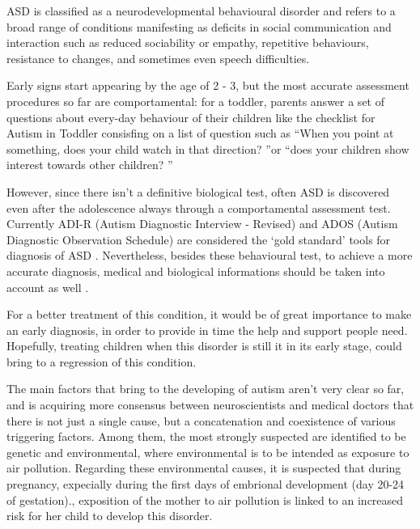 \documentclass[10pt]{report}
\begin{document}
ASD is classified as a neurodevelopmental behavioural disorder \cite{guze-1995} \cite{who-1993} and refers to a broad range of conditions manifesting as deficits in social communication and interaction such as reduced sociability or empathy, repetitive behaviours, resistance to changes, and sometimes even speech difficulties.\cite{rapin-2008}


Early signs start appearing by the age of 2 - 3, but the most accurate assessment procedures so far are comportamental: for a toddler, parents answer a set of questions about every-day behaviour of their children like the checklist for Autism in Toddler \cite{robins-2009} consisfing on a list of question such as \textquotedblleft When you point at something, does your child watch in that direction? \textquotedblright or \textquotedblleft does your children show interest towards other children? \textquotedblright

However, since there isn't a definitive biological test, often ASD is discovered even after the adolescence always through a comportamental assessment test.
Currently ADI-R (Autism Diagnostic Interview - Revised) and ADOS (Autism Diagnostic Observation Schedule) are considered the ‘gold standard’ tools for diagnosis of ASD \cite{ozonoff-2015} \cite{lecouteur-2008}.
Nevertheless, besides these behavioural test, to achieve a more accurate diagnosis, medical and biological informations should be taken into account as well .

For a better treatment of this condition, it would be of great importance to make an early diagnosis, in order to provide in time the help and support people need.
Hopefully, treating children when this disorder is still it in its early stage, could bring to a regression of this condition.

The main factors that bring to the developing of autism aren't very clear so far, and is acquiring more consensus between neuroscientists and medical doctors that there is not just a single cause, but a concatenation and coexistence of various triggering factors.
Among them, the most strongly suspected are identified to be genetic and environmental, where environmental is to be intended as exposure to air pollution.
Regarding these environmental causes, it is suspected that during pregnancy, expecially during the first days of embrional development (day 20-24 of gestation).\cite{ratajczak-2011}, exposition of the mother to air pollution is linked to an increased risk for her child to develop this disorder.
\end{document}
